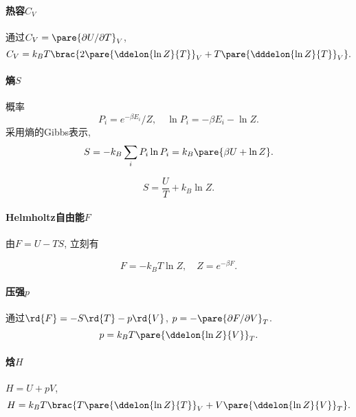 \documentclass[../Thermal.tex]{subfiles}
\begin{document}
\paragraph{热容$C_V$} 通过$C_V=\pare{\partial U/\partial T}_V$,
\[ C_V = k_BT\brac{2\pare{\ddelon{\ln Z}{T}}_V + T\pare{\dddelon{\ln Z}{T}}_V}. \]
\paragraph{熵$S$} 概率
\[ P_i = e^{-\beta E_i}/Z,\quad \ln P_i = -\beta E_i - \ln Z. \]
采用熵的Gibbs表示,
\[ S = -k_B \sum_i P_i \ln P_i = k_B\pare{\beta U + \ln Z}. \]
\begin{finale}
\[ S = \frac{U}{T} + k_B \ln Z. \]
\end{finale}
\paragraph{Helmholtz自由能$F$} 由$F=U-TS$, 立刻有
\begin{finale}
\[ F = -k_BT\ln Z,\quad Z = e^{-\beta F}. \]
\end{finale}
\paragraph{压强$p$} 通过$\rd{F} = -S\rd{T} - p\rd{V}$, $p=-\pare{\partial F/\partial V}_T$.
\[ p = k_B T \pare{\ddelon{\ln Z}{V}}_T. \]
\paragraph{焓$H$} $H = U + pV$,
\[ H = k_B T\brac{T\pare{\ddelon{\ln Z}{T}}_V + V\pare{\ddelon{\ln Z}{V}}_T}. \]
\end{document}
